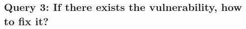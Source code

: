 %
\subsection{Query 3: If there exists the vulnerability, how to fix it?}
%
\begin{lstlisting}[language=clingo,caption=Reasoning for Truthworthiness aspect, label=list8, mathescape=true,xleftmargin=.01\textwidth, breaklines=true]

\end{lstlisting}
%